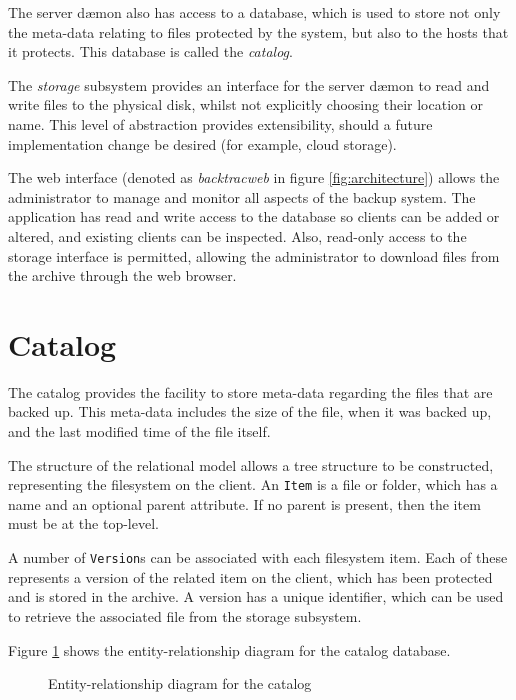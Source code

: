 The server d{\ae}mon also has access to a database, which is used to store not
only the meta-data relating to files protected by the system, but also to the
hosts that it protects. This database is called the \emph{catalog}.

The \emph{storage} subsystem provides an interface for the server d{\ae}mon to
read and write files to the physical disk, whilst not explicitly choosing their
location or name. This level of abstraction provides extensibility, should
a future implementation change be desired (for example, cloud storage).

The web interface (denoted as \emph{backtracweb} in figure
\ref{fig:architecture}) allows the administrator to manage and monitor all
aspects of the backup system. The application has read and write access to the
database so clients can be added or altered, and existing clients can be
inspected. Also, read-only access to the storage interface is permitted,
allowing the administrator to download files from the archive through the web
browser.

\section{Catalog}

The catalog provides the facility to store meta-data regarding the files that
are backed up. This meta-data includes the size of the file, when it was backed
up, and the last modified time of the file itself.

The structure of the relational model allows a tree structure to be
constructed, representing the filesystem on the client. An \verb!Item! is
a file or folder, which has a name and an optional parent attribute. If no
parent is present, then the item must be at the top-level.

A number of \verb!Version!s can be associated with each filesystem item. Each
of these represents a version of the related item on the client, which has been
protected and is stored in the archive. A version has a unique identifier,
which can be used to retrieve the associated file from the storage subsystem.

Figure \ref{fig:erd} shows the entity-relationship diagram for the catalog
database.

\begin{figure}
    \begin{center}
        
    \end{center}
    \caption{Entity-relationship diagram for the catalog}
    \label{fig:erd}
\end{figure}

